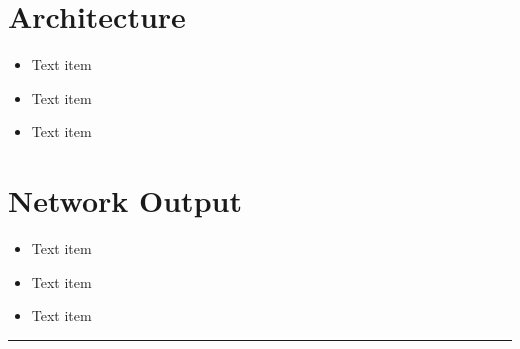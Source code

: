 \documentclass[landscape,a2,final,10pt]{issposter}
\begin{document}
\begin{multicols}{3}
    \section{Architecture}
        \begin{itemize}
            \item Text item
            \item Text item
            \item Text item
        \end{itemize}
    \columnbreak
    \section{Network Output}
        \begin{itemize}
            \item Text item
            \item Text item
            \item Text item
        \end{itemize}
    \columnbreak
\end{multicols}


\rule{\textwidth}{8pt}
\end{document}
